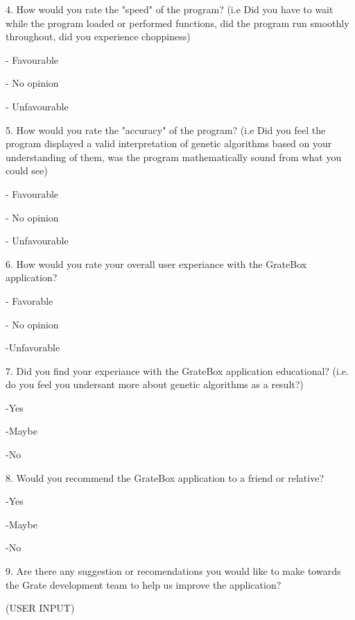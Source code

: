 \documentclass[12pt, titlepage]{article}
\begin{document}
4. How would you rate the "speed" of the program? (i.e Did you have to wait 
while the program loaded or performed functions, did the program run smoothly 
throughout, did you experience choppiness)

- Favourable

- No opinion

- Unfavourable

5. How would you rate the "accuracy" of the program? (i.e Did you feel the 
program displayed a valid interpretation of genetic algorithms based on your 
understanding of them, was the program mathematically sound from what you could 
see)

- Favourable

- No opinion

- Unfavourable

6. How would you rate your overall user experiance with the GrateBox
application?

- Favorable

- No opinion

-Unfavorable

7. Did you find your experiance with the GrateBox application educational? 
(i.e. do you feel you undersant more about genetic algorithms as a result?)

-Yes

-Maybe

-No

8. Would you recommend the GrateBox application to a friend or relative?

-Yes

-Maybe

-No

9. Are there any suggestion or recomendations you would like to make towards the 
Grate development team to help us improve the application?

(USER INPUT)
\end{document}
